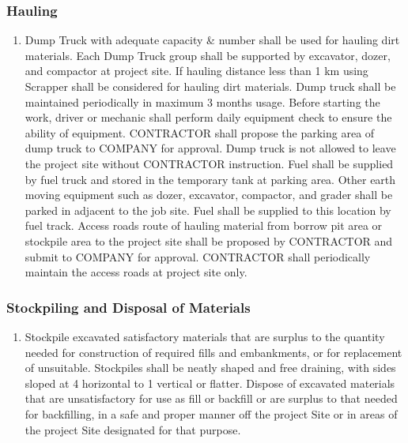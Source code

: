 \documentclass{article}%
\begin{document}
%
\subsubsection{Hauling}%
\label{ssubsec:Hauling}%
\begin{enumerate}[label=\alph*),start=1]%
\item%
Dump Truck with adequate capacity \& number shall be used for hauling dirt materials. Each Dump Truck group shall be supported by excavator, dozer, and compactor at project site. If hauling distance less than 1 km using Scrapper shall be considered for hauling dirt materials. Dump truck shall be maintained periodically in maximum 3 months usage. Before starting the work, driver or mechanic shall perform daily equipment check to ensure the ability of equipment. CONTRACTOR shall propose the parking area of dump truck to COMPANY for approval. Dump truck is not allowed to leave the project site without CONTRACTOR instruction. Fuel shall be supplied by fuel truck and stored in the temporary tank at parking area. Other earth moving equipment such as dozer, excavator, compactor, and grader shall be parked in adjacent to the job site. Fuel shall be supplied to this location by fuel track. Access roads route of hauling material from borrow pit area or stockpile area to the project site shall be proposed by CONTRACTOR and submit to COMPANY for approval. CONTRACTOR shall periodically maintain the access roads at project site only.%
\end{enumerate}

%
\subsubsection{Stockpiling and Disposal of Materials}%
\label{ssubsec:StockpilingandDisposalofMaterials}%
\begin{enumerate}[label=\alph*),start=1]%
\item%
Stockpile excavated satisfactory materials that are surplus to the quantity needed for construction of required fills and embankments, or for replacement of unsuitable. Stockpiles shall be neatly shaped and free draining, with sides sloped at 4 horizontal to 1 vertical or flatter. Dispose of excavated materials that are unsatisfactory for use as fill or backfill or are surplus to that needed for backfilling, in a safe and proper manner off the project Site or in areas of the project Site designated for that purpose.%
\end{enumerate}

%
\end{document}
